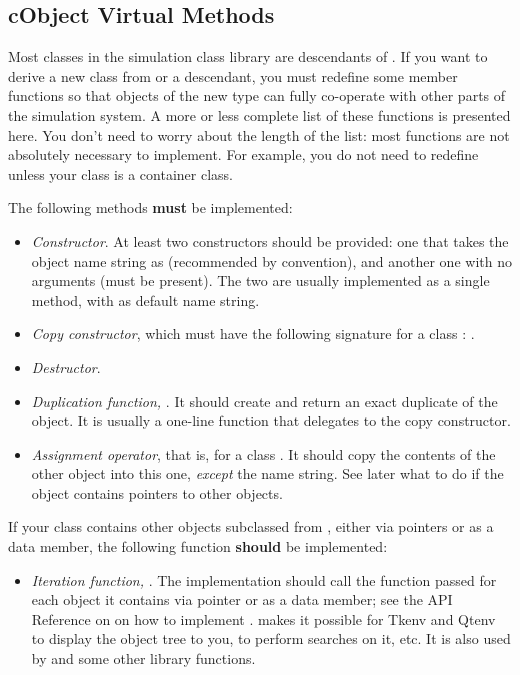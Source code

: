 \subsection{cObject Virtual Methods}
\label{sec:sim-lib:cobject-virtual-methods}

Most classes in the simulation class library are descendants of
. If you want to derive a new class from
 or a  descendant, you must redefine
some member functions so that objects of the new type can fully
co-operate with other parts of the simulation system. A more or less
complete list of these functions is presented here. You don't need to
worry about the length of the list: most functions are not
absolutely necessary to implement. For example, you do not need to
redefine  unless your class is a container class.

The following methods \textbf{must} be implemented:

\begin{itemize}
  \item{\textit{Constructor}. At least two constructors should be provided:
        one that takes the object name string as 
        (recommended by convention), and another one with no arguments
        (must be present). The two are usually implemented as a single
        method, with  as default name string.}
  \item{\textit{Copy constructor}, which must have the following signature
        for a class : .}
  \item{\textit{Destructor}.}
  \item{\textit{Duplication function,} .
        It should create and return an exact duplicate of the object.
        It is usually a one-line function that delegates to the copy constructor.}
  \item{\textit{Assignment operator}, that is, 
        for a class . It should copy the contents of the other
        object into this one, \textit{except} the name string. See later what to do
        if the object contains pointers to other objects.}
\end{itemize}

If your class contains other objects subclassed from ,
either via pointers or as a data member, the following function \textbf{should}
be implemented:

\begin{itemize}
  \item{\textit{Iteration function,} .
        The implementation should call the function passed
        for each object it contains via pointer or as a data member;
        see the API Reference on  on how to implement
        .  makes it possible
        for Tkenv and Qtenv to display the object tree to you, to perform searches on it, etc.
        It is also used by  and some other library functions.}
\end{itemize}

